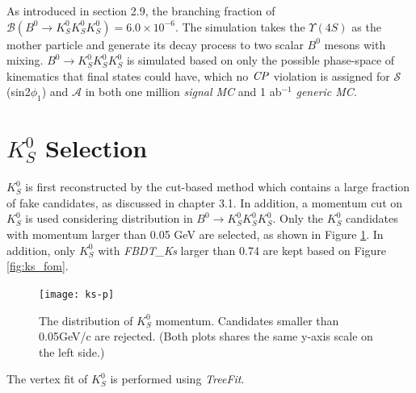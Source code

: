 As introduced in section 2.9, the branching fraction of $\mathcal{B}(B^0 \to K_S^0  K_S^0  K_S^0) = 6.0 \times 10^{-6}$. The simulation takes the $\Upsilon(4S)$ as the mother particle and generate its decay process to two scalar $B^0$ mesons with mixing. $B^0 \to K_S^0  K_S^0  K_S^0$ is simulated based on only the possible phase-space of kinematics that final states could have, which no $\it{CP}$ violation is assigned for $\mathcal{S}$(sin2$\phi_1$) and $\mathcal{A}$ in both one million \textit{signal MC} and 1 ab$^{-1}$ \textit{generic MC}.

\section{$K_S^0$ Selection}
$K_S^0$ is first reconstructed by the cut-based method which contains a large fraction of fake candidates, as discussed in chapter 3.1. In addition, a momentum cut on $K_S^0$ is used considering distribution in $B^0 \to K_S^0  K_S^0  K_S^0$. Only the $K_S^0$ candidates with momentum larger than 0.05 GeV are selected, as shown in Figure \ref{fig:ks-p}. In addition, only $K_S^0$ with \textit{FBDT\_Ks} larger than 0.74 are kept based on Figure \ref{fig:ks_fom}.
\begin{figure}[ht]
	\centering
	\texttt{[image: ks-p]}
	\caption{The distribution of $K_S^0$ momentum. Candidates smaller than 0.05GeV/c are rejected. (Both plots shares the same y-axis scale on the left side.)}
	\label{fig:ks-p}
\end{figure}
The vertex fit of $K_S^0$ is performed using \textit{TreeFit}. 

